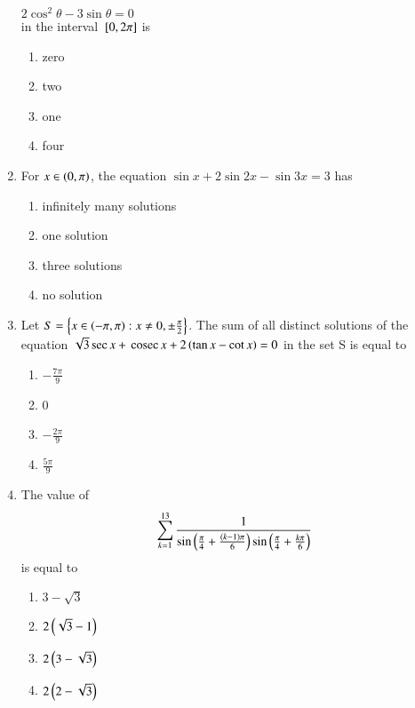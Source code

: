 \documentclass[journal,12pt,twocolumn,article]{IEEEtran}
\theoremstyle{remark}
\begin{document}
\begin{enumerate}[start = 20]
$2\cos^2\theta - 3\sin\theta = 0$\\
in the interval ${}\left[0,2\pi\right]$ is
\hfill{}
\begin{multicols}{2}
\begin{enumerate}
\item zero
\item two
\columnbreak
\item one
\item four
\end{enumerate}
\end{multicols}
\item For $x \in \left(0,\pi\right)$, the equation $\sin x + 2\sin 2x - \sin 3x = 3$ has
\hfill{}
\begin{multicols}{2}
\begin{enumerate}
\item infinitely many solutions
\item one solution
\columnbreak
\item three solutions
\item no solution
\end{enumerate}
\end{multicols}
\item Let $S = \left\{x \in \left(-\pi,\pi\right) : x \neq 0, \pm \frac{\pi}{2}\right\}$. The sum of all distinct solutions of the equation $\sqrt{3} \sec x + \,\text{cosec}\, x + 2\left(\tan x - \cot x\right) = 0$ in the set S is equal to
\hfill{}
\begin{multicols}{2}
\begin{enumerate}
\item $-\frac{7\pi}{9}$
\item 0
\columnbreak
\item $-\frac{2\pi}{9}$
\item $\frac{5\pi}{9}$
\end{enumerate}
\end{multicols}
\item The value of 
\begin{align*}
\sum_{k=1}^{13} \frac{1}{\sin\left(\frac{\pi}{4} + \frac{\left(k-1\right)\pi}{6}\right)\sin\left(\frac{\pi}{4} + \frac{k\pi}{6}\right)}
\end{align*}
is equal to
\hfill{}
\begin{multicols}{2}
\begin{enumerate}
\item $3-\sqrt{3}$
\item $2\left(\sqrt{3}-1\right)$
\columnbreak
\item $2\left(3-\sqrt{3}\right)$
\item $2\left(2-\sqrt{3}\right)$
\end{enumerate}
\end{multicols}
\end{enumerate}
\end{document}
